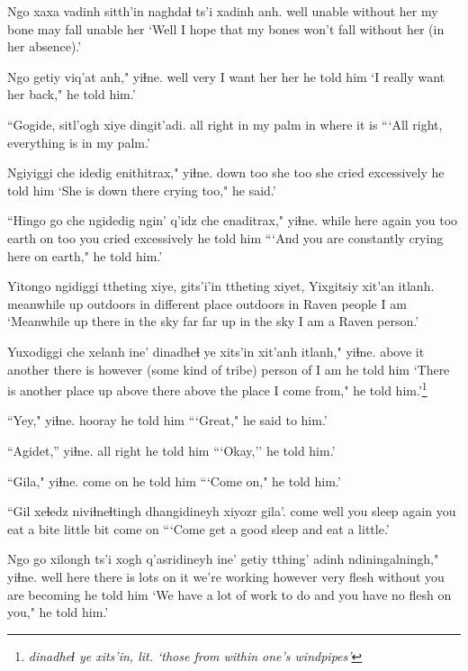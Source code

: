 \documentclass[12pt]{article}
\begin{document}
\gll Ngo xaxa vadinh sitth'in naghdaɬ ts'i xadinh anh.
well unable {without her} {my bone} {may fall} {} unable her
\glt `Well I hope that my bones won't fall without her (in her absence).'
\glend

\gll Ngo getiy viq'at anh," yiɬne.
well very {I want her} her {he told him}
\glt `I really want her back," he told him.'
\glend

\gll ``Gogide, sitl'ogh xiye dingit'adi.
{all right} {in my palm} in {where it is}
\glt ```All right, everything is in my palm.'
\glend

\gll Ngiyiggi che idedig enithitrax," yiɬne.
down too {she too} {she cried excessively} {he told him}
\glt `She is down there crying too," he said.'
\glend

\gll ``Hingo go che ngidedig ngin' q'idz che enaditrax," yiɬne.
while here again {you too} earth on too {you cried excessively} {he told him}
\glt ```And you are constantly crying here on earth," he told him.'
\glend

\gll Yitongo ngidiggi ttheting xiye, gits'i'in ttheting xiyet, Yixgitsiy xit'an itlanh.
meanwhile up {outdoors} in {different place} outdoors in Raven people {I am}
\glt `Meanwhile up there in the sky far far up in the sky I am a Raven person.'
\glend

\gll Yuxodiggi che xelanh ine' {dinadheɬ ye xits'in} xit'anh itlanh," yiɬne.
{above it} another {there is} however {(some kind of tribe)} {person of} {I am} {he told him}
\glt `There is another place up above there above the place I come from," he told him.'\footnote{\em dinadheɬ ye xits'in, \em lit. `those from within one's windpipes'}
\glend

\gll ``Yey," yiɬne.
hooray {he told him}
\glt ```Great," he said to him.'
\glend

\gll ``Agidet,'' yiɬne.
{all right} {he told him}
\glt ```Okay,'' he told him.'
\glend

\gll ``Gila," yiɬne.
{come on} {he told him}
\glt ```Come on," he told him.'
\glend

\gll ``Gil xeɬedz niviɬneɬtingh dhangidineyh xiyozr gila'. 
come well {you sleep again} {you eat a bite} {little bit} {come on} 
\glt ```Come get a good sleep and eat a little.'
\glend

\gll Ngo go xilongh ts'i xogh q'asridineyh ine' getiy tthing' adinh ndiningalningh," yiɬne.
well here {there is lots} {} {on it} {we're working} however very flesh without {you are becoming} {he told him}
\glt `We have a lot of work to do and you have no flesh on you," he told him.'
\glend
\end{document}
